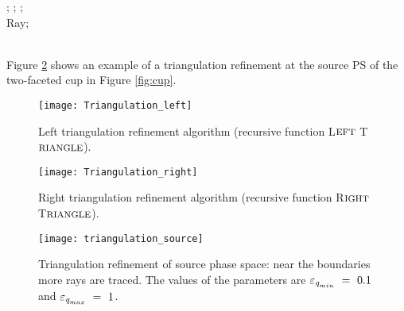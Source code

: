 \begin{algorithm}[h]
\begin{algorithmic}[1]
\State{};
\State{};
\State{};
\EndIf \\
\Return Ray;
\EndProcedure
\end{algorithmic}
\end{algorithm}
\\ \indent Figure \ref{fig:triangulation_refinement} shows an example of a triangulation refinement at the source PS of the two-faceted cup in Figure \ref{fig:cup}.
 \begin{figure}[h]
 \begin{minipage}[t]{0.48\textwidth}
\centering
    \texttt{[image: Triangulation\_left]}
    \caption{Left triangulation refinement algorithm (recursive function L$\footnotesize{\textrm{EFT}}$ T$\footnotesize{\textrm{RIANGLE}}$).}
    \label{fig:triangulation_left}
\end{minipage}
\hfill
\begin{minipage}[t]{0.48\textwidth}
\centering
    \texttt{[image: Triangulation\_right]}
    \caption{Right triangulation refinement algorithm (recursive function R$\footnotesize{\textrm{IGHT}}$ T$\footnotesize{\textrm{RIANGLE}}$).}
    \label{fig:triangulation_right}
\end{minipage}
\end{figure}
\begin{figure}[h]
  \begin{center}
  \texttt{[image: triangulation\_source]}
  \end{center}
  \caption{Triangulation refinement of source phase space:
  near the boundaries more rays are traced.
    The values of the parameters are $\varepsilon_{\textit{q}_{min}}~=~ 0.1$ and $\varepsilon_{\textit{q}_{max}}~=~1$.}
   \label{fig:triangulation_refinement}
  \end{figure}
